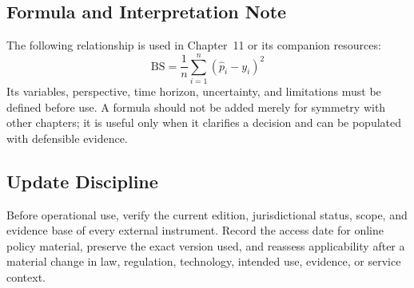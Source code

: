 \subsection{Formula and Interpretation Note}
The following relationship is used in Chapter~11 or its companion resources:
\begin{equation}
\mathrm{BS}=\frac{1}{n}\sum_{i=1}^{n}(\hat p_i-y_i)^2
\label{eq:comp-ch11-reference-formula}
\end{equation}
Its variables, perspective, time horizon, uncertainty, and limitations must be
defined before use. A formula should not be added merely for symmetry with other
chapters; it is useful only when it clarifies a decision and can be populated with
defensible evidence.

\subsection{Update Discipline}
Before operational use, verify the current edition, jurisdictional status, scope,
and evidence base of every external instrument. Record the access date for online
policy material, preserve the exact version used, and reassess applicability after a
material change in law, regulation, technology, intended use, evidence, or service
context.

